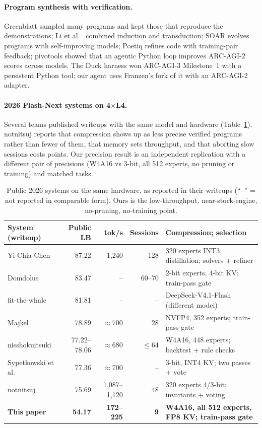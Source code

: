 \documentclass[11pt]{article}
\begin{document}
\paragraph{Program synthesis with verification.} Greenblatt \cite{greenblatt2024} sampled many programs and kept those that reproduce the demonstrations; Li et al.\ \cite{li2024} combined induction and transduction; SOAR \cite{soar2025} evolves programs with self-improving models; Poetiq \cite{poetiq} refines code with training-pair feedback; pivotools \cite{pivotools2026} showed that an agentic Python loop improves ARC-AGI-2 scores across models. The Duck harness \cite{duck} won ARC-AGI-3 Milestone~1 with a persistent Python tool; our agent uses Franzen's fork of it \cite{duckfork} with an ARC-AGI-2 adapter.
\paragraph{2026 Flash-Next systems on 4$\times$L4.} Several teams published writeups with the same model and hardware (Table~\ref{tab:public}). notnitsuj \cite{notnitsuj2026} reports that compression shows up as less precise verified programs rather than fewer of them, that memory sets throughput, and that aborting slow sessions costs points. Our precision result is an independent replication with a different pair of precisions (W4A16 vs 3-bit, all 512 experts, no pruning or training) and matched tasks.

\begin{table}[t]
\centering\small
\begin{tabularx}{\linewidth}{@{}lrrrX@{}}
\toprule
System (writeup) & Public LB & tok/s & Sessions & Compression; selection \\
\midrule
Yi-Chia Chen \cite{yichia2026} & 87.22 & 1{,}240 & 128 & 320 experts INT3, distillation; solvers + refiner \\
Domdolus \cite{domdolus2026} & 83.47 & -- & 60--70 & 2-bit experts, 4-bit KV; train-pass gate \\
fit-the-whale \cite{whale2026} & 81.81 & -- & -- & DeepSeek-V4.1-Flash (different model) \\
Majkel \cite{majkel2026} & 78.89 & $\approx$700 & 28 & NVFP4, 352 experts; train-pass gate \\
nisshokuitsuki \cite{ni2026} & 77.22--78.06 & $\approx$680 & $\le$64 & W4A16, 448 experts; backtest + rule checks \\
Sypetkowski et al.\ \cite{maciej2026} & 77.36 & $\approx$700 & -- & 3-bit, INT4 KV; two passes + vote \\
notnitsuj \cite{notnitsuj2026} & 75.69 & 1{,}087--1{,}120 & 48 & 320 experts 4/3-bit; invariants + voting \\
\textbf{This paper} & \textbf{54.17} & \textbf{172--225} & \textbf{9} & \textbf{W4A16, all 512 experts, FP8 KV; train-pass gate} \\
\bottomrule
\end{tabularx}
\caption{Public 2026 systems on the same hardware, as reported in their writeups (``--'' = not reported in comparable form). Ours is the low-throughput, near-stock-engine, no-pruning, no-training point.}
\label{tab:public}
\end{table}
\end{document}
